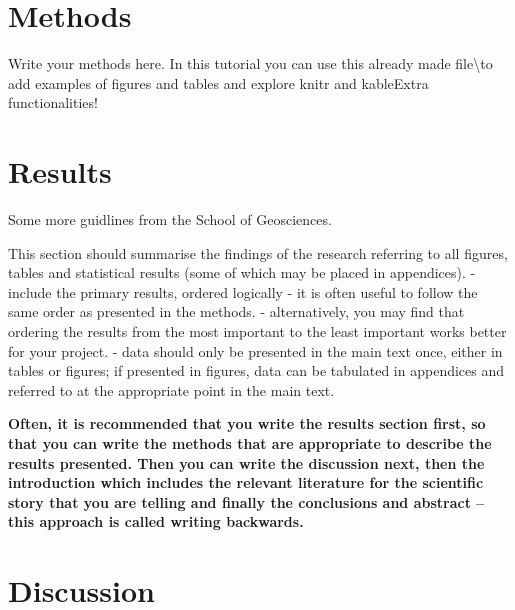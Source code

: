 \documentclass[
  11pt,
]{article}
\begin{document}
\newpage

\hypertarget{methods}{%
\section{Methods}\label{methods}}

\vspace{0.5cm}

Write your methods here. In this tutorial you can use this already made
file\textbackslash to add examples of figures and tables and explore
knitr and kableExtra functionalities! \newpage

\hypertarget{results}{%
\section{Results}\label{results}}

Some more guidlines from the School of Geosciences.

This section should summarise the findings of the research referring to
all figures, tables and statistical results (some of which may be placed
in appendices). - include the primary results, ordered logically - it is
often useful to follow the same order as presented in the methods. -
alternatively, you may find that ordering the results from the most
important to the least important works better for your project. - data
should only be presented in the main text once, either in tables or
figures; if presented in figures, data can be tabulated in appendices
and referred to at the appropriate point in the main text.

\textbf{Often, it is recommended that you write the results section
first, so that you can write the methods that are appropriate to
describe the results presented. Then you can write the discussion next,
then the introduction which includes the relevant literature for the
scientific story that you are telling and finally the conclusions and
abstract -- this approach is called writing backwards.} \newpage

\hypertarget{discussion}{%
\section{Discussion}\label{discussion}}
\end{document}
